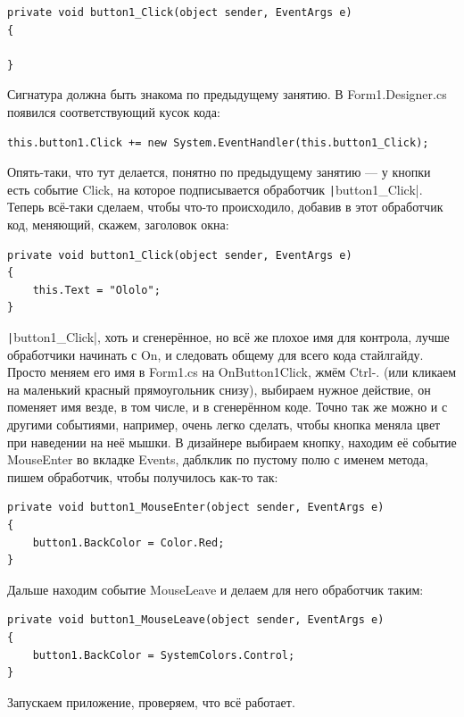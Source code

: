 \documentclass{../../text-style}
\begin{document}
\begin{verbatim}
private void button1_Click(object sender, EventArgs e)
{

}
\end{verbatim}

Сигнатура должна быть знакома по предыдущему занятию. В Form1.Designer.cs появился соответствующий кусок кода:

\begin{verbatim}
this.button1.Click += new System.EventHandler(this.button1_Click);
\end{verbatim}

Опять-таки, что тут делается, понятно по предыдущему занятию --- у кнопки есть событие Click, на которое подписывается обработчик \texttt|button1_Click|. Теперь всё-таки сделаем, чтобы что-то происходило, добавив в этот обработчик код, меняющий, скажем, заголовок окна:

\begin{verbatim}
private void button1_Click(object sender, EventArgs e)
{
    this.Text = "Ololo";
}
\end{verbatim}

\texttt|button1_Click|, хоть и сгенерённое, но всё же плохое имя для контрола, лучше обработчики начинать с On, и следовать общему для всего кода стайлгайду. Просто меняем его имя в Form1.cs на OnButton1Click, жмём Ctrl-. (или кликаем на маленький красный прямоугольник снизу), выбираем нужное действие, он поменяет имя везде, в том числе, и в сгенерённом коде. Точно так же можно и с другими событиями, например, очень легко сделать, чтобы кнопка меняла цвет при наведении на неё мышки. В дизайнере выбираем кнопку, находим её событие MouseEnter во вкладке Events, даблклик по пустому полю с именем метода, пишем обработчик, чтобы получилось как-то так:

\begin{verbatim}
private void button1_MouseEnter(object sender, EventArgs e)
{
    button1.BackColor = Color.Red;
}
\end{verbatim}

Дальше находим событие MouseLeave и делаем для него обработчик таким:

\begin{verbatim}
private void button1_MouseLeave(object sender, EventArgs e)
{
    button1.BackColor = SystemColors.Control;
}
\end{verbatim}

Запускаем приложение, проверяем, что всё работает.
\end{document}
